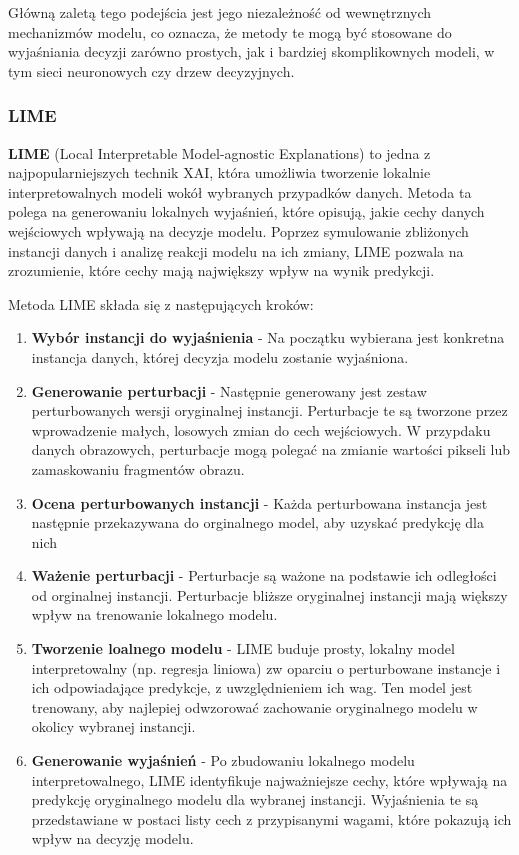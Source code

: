 Główną zaletą tego podejścia jest jego niezależność od wewnętrznych mechanizmów modelu, co oznacza, że metody te mogą być stosowane do wyjaśniania decyzji zarówno prostych, jak i bardziej skomplikownych modeli, w tym sieci neuronowych czy drzew decyzyjnych.

\subsubsection*{LIME}
\textbf{LIME} \cite{ribeiro2016why} (Local Interpretable Model-agnostic Explanations) to jedna z najpopularniejszych technik XAI, która umożliwia tworzenie lokalnie interpretowalnych modeli wokół wybranych przypadków danych.
Metoda ta polega na generowaniu lokalnych wyjaśnień, które opisują, jakie cechy danych wejściowych wpływają na decyzje modelu.
Poprzez symulowanie zbliżonych instancji danych i analizę reakcji modelu na ich zmiany, LIME pozwala na zrozumienie, które cechy mają największy wpływ na wynik predykcji.



Metoda LIME składa się z następujących kroków:
\begin{enumerate}
	\item \textbf{Wybór instancji do wyjaśnienia} - Na początku wybierana jest konkretna instancja danych, której decyzja modelu zostanie  wyjaśniona.
	\item \textbf{Generowanie perturbacji} - Następnie generowany jest zestaw perturbowanych wersji oryginalnej instancji.
	      Perturbacje te są tworzone przez wprowadzenie małych, losowych zmian do cech wejściowych.
	      W przypdaku danych obrazowych, perturbacje mogą polegać na zmianie wartości pikseli lub zamaskowaniu fragmentów obrazu.
	\item \textbf{Ocena perturbowanych instancji} - Każda perturbowana instancja jest następnie przekazywana do orginalnego model, aby uzyskać predykcję dla nich
	\item \textbf{Ważenie perturbacji} - Perturbacje są ważone na podstawie ich odległości od orginalnej instancji.
	      Perturbacje bliższe oryginalnej instancji mają większy wpływ na trenowanie lokalnego modelu.
	\item \textbf{Tworzenie loalnego modelu} - LIME buduje prosty, lokalny model interpretowalny (np. regresja liniowa) zw oparciu o perturbowane instancje i ich odpowiadające predykcje, z uwzględnieniem ich wag.
	      Ten model jest trenowany, aby najlepiej odwzorować zachowanie oryginalnego modelu w okolicy wybranej instancji.
	\item \textbf{Generowanie wyjaśnień} - Po zbudowaniu lokalnego modelu interpretowalnego, LIME identyfikuje najważniejsze cechy, które wpływają na predykcję oryginalnego modelu dla wybranej instancji.
	      Wyjaśnienia te są przedstawiane w postaci listy cech z przypisanymi wagami, które pokazują ich wpływ na decyzję modelu.
\end{enumerate}

